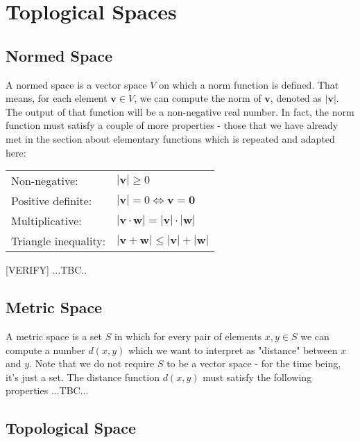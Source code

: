 \section{Toplogical Spaces}

\subsection{Normed Space}
A normed space is a vector space $V$ on which a norm function is defined. That means, for each element $\mathbf{v} \in V$, we can compute the norm of $\mathbf{v}$, denoted as $|\mathbf{v}|$. The output of that function will be a non-negative real number. In fact, the norm function must satisfy a couple of more properties - those that we have already met in the section about elementary functions which is repeated and adapted here:

\medskip
\begin{tabular}{l l}
Non-negative:         & $|\mathbf{v}| \geq 0$  \\
Positive definite:    & $|\mathbf{v}| = 0 \Leftrightarrow \mathbf{v} = \mathbf{0}$  \\
Multiplicative:       & $|\mathbf{v} \cdot \mathbf{w}| = |\mathbf{v}| \cdot |\mathbf{w}| $  \\
Triangle inequality:  & $|\mathbf{v} + \mathbf{w}| \leq |\mathbf{v}| + |\mathbf{w}| $
\end{tabular}
\medskip

[VERIFY]
...TBC..

\subsection{Metric Space}
A metric space is a set $S$ in which for every pair of elements $x,y \in S$ we can compute a number $d(x,y)$ which we want to interpret as "distance" between $x$ and $y$. Note that we do not require $S$ to be a vector space - for the time being, it's just a set. The distance function $d(x,y)$ must satisfy the following properties ...TBC...

\subsection{Topological Space}